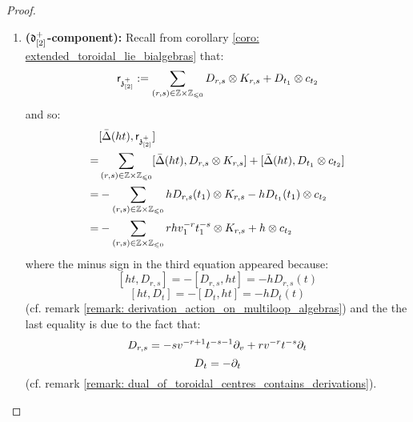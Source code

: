 \begin{proof}
\begin{enumerate}
\begin{enumerate}
                        \item \textbf{($\mathfrak{d}_{[2]}^+$-component):} Recall from corollary \ref{coro: extended_toroidal_lie_bialgebras} that:
                            $$\sfr_{\z_{[2]}^+} := \sum_{(r, s) \in \Z \x \Z_{\leq 0}} D_{r, s} \tensor K_{r, s} + D_{t_1} \tensor c_{t_2}$$
                        and so:
                            $$
                                \begin{aligned}
                                    & [\bar{\Delta}(ht), \sfr_{\z_{[2]}^+}]
                                    \\
                                    = & \sum_{(r, s) \in \Z \x \Z_{\leq 0}} [\bar{\Delta}(ht), D_{r, s} \tensor K_{r, s}] + [\bar{\Delta}(ht), D_{t_1} \tensor c_{t_2}]
                                    \\
                                    = & -\sum_{(r, s) \in \Z \x \Z_{\leq 0}} h D_{r, s}(t_1) \tensor K_{r, s} - h D_{t_1}(t_1) \tensor c_{t_2}
                                    \\
                                    = & -\sum_{(r, s) \in \Z \x \Z_{\leq 0}} r h v_1^{-r} t_1^{-s} \tensor K_{r, s} + h \tensor c_{t_2}
                                \end{aligned}
                            $$
                        where the minus sign in the third equation appeared because:
                            $$[ht, D_{r, s}] = -[D_{r, s}, ht] = -h D_{r, s}(t)$$
                            $$[ht, D_t] = -[D_t, ht] = -h D_t(t)$$
                        (cf. remark \ref{remark: derivation_action_on_multiloop_algebras}) and the the last equality is due to the fact that:
                            $$D_{r, s} = -s v^{-r + 1} t^{-s - 1} \partial_v + r v^{-r} t^{-s} \partial_t$$
                            $$D_t = -\partial_t$$
                        (cf. remark \ref{remark: dual_of_toroidal_centres_contains_derivations}). 
                    \end{enumerate}


\end{enumerate}
\end{proof}
